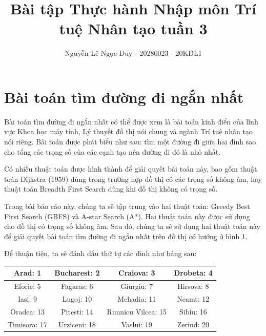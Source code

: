 \documentclass[a4paper, 11pt]{article}
\title{\textbf{Bài tập Thực hành Nhập môn Trí tuệ Nhân tạo tuần 3}}
\author{Nguyễn Lê Ngọc Duy - 20280023 - 20KDL1}
\date{}
\begin{document}
\maketitle
\hypersetup{linkcolor=black}
\tableofcontents

\clearpage

\section{Bài toán tìm đường đi ngắn nhất}
Bài toán tìm đường đi ngắn nhất có thể được xem là bài toán kinh điển của lĩnh vực Khoa học máy tính, Lý thuyết đồ thị nói chung và ngành Trí tuệ nhân tạo nói riêng. Bài toán được phát biểu như sau: tìm một đường đi giữa hai đỉnh sao cho tổng các trọng số của các cạnh tạo nên đường đi đó là nhỏ nhất.

Có nhiều thuật toán được hình thành để giải quyết bài toán này, bao gồm thuật toán Dijkstra (1959) dùng trong trường hợp đồ thị có các trọng số không âm, hay thuật toán Breadth First Search dùng khi đồ thị không có trọng số.

Trong bài báo cáo này, chúng ta sẽ tập trung vào hai thuật toán: Greedy Best First Search (GBFS) và A-star Search (A*). Hai thuật toán này được sử dụng cho đồ thị có trọng số không âm. Sau đó, chúng ta sẽ sử dụng hai thuật toán này để giải quyết bài toán tìm đường đi ngắn nhất trên đồ thị có hướng ở hình 1.

Để thuận tiện, ta sẽ đánh dấu thứ tự các đỉnh như bảng sau:
\begin{center}
  \begin{tabular}{ |c|c|c|c| }
    \hline
    Arad: 1 & Bucharest: 2 & Craiova: 3 & Drobeta: 4 \\
    \hline
    Eforie: 5 & Fagaras: 6 & Giurgiu: 7 & Hirsova: 8 \\
    \hline
    Iasi: 9 & Lugoj: 10 & Mehadia: 11 & Neamt: 12 \\
    \hline
    Oradea: 13 & Pitesti: 14 & Rimnicu Vilcea: 15 & Sibiu: 16 \\
    \hline
    Timisora: 17 & Urziceni: 18 & Vaslui: 19 & Zerind: 20 \\
    \hline
  \end{tabular}
\end{center}
\end{document}
